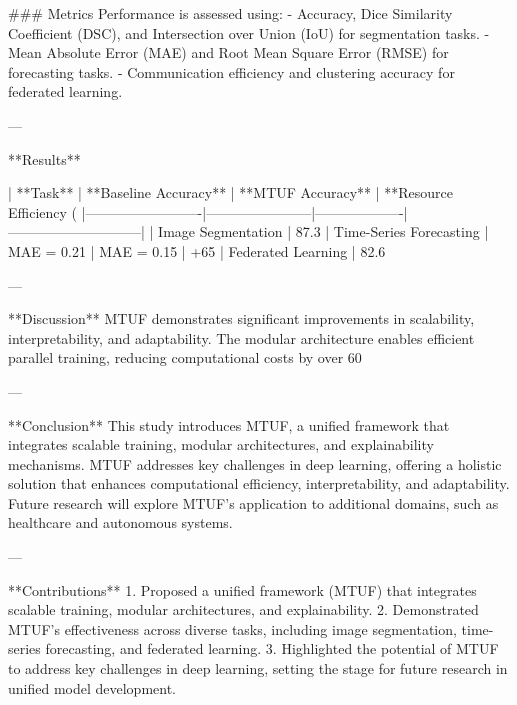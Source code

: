 ### Metrics  
Performance is assessed using:
- Accuracy, Dice Similarity Coefficient (DSC), and Intersection over Union (IoU) for segmentation tasks.
- Mean Absolute Error (MAE) and Root Mean Square Error (RMSE) for forecasting tasks.
- Communication efficiency and clustering accuracy for federated learning.

---

**Results**  

| **Task**               | **Baseline Accuracy** | **MTUF Accuracy** | **Resource Efficiency (%
|-------------------------|-----------------------|-------------------|-----------------------------|
| Image Segmentation      | 87.3%
| Time-Series Forecasting | MAE = 0.21           | MAE = 0.15       | +65%
| Federated Learning      | 82.6%

---

**Discussion**  
MTUF demonstrates significant improvements in scalability, interpretability, and adaptability. The modular architecture enables efficient parallel training, reducing computational costs by over 60%

---

**Conclusion**  
This study introduces MTUF, a unified framework that integrates scalable training, modular architectures, and explainability mechanisms. MTUF addresses key challenges in deep learning, offering a holistic solution that enhances computational efficiency, interpretability, and adaptability. Future research will explore MTUF's application to additional domains, such as healthcare and autonomous systems.

---

**Contributions**  
1. Proposed a unified framework (MTUF) that integrates scalable training, modular architectures, and explainability.  
2. Demonstrated MTUF's effectiveness across diverse tasks, including image segmentation, time-series forecasting, and federated learning.  
3. Highlighted the potential of MTUF to address key challenges in deep learning, setting the stage for future research in unified model development.